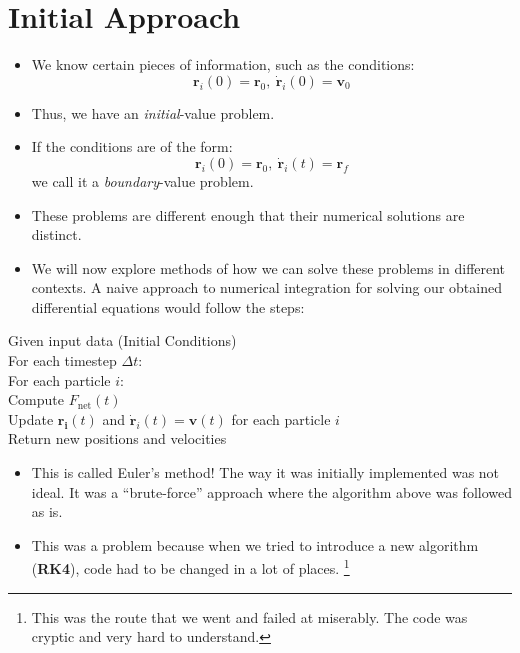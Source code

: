 \documentclass[11pt]{article}
\newcommand{\psubsection}[1]{{\section*{\LARGE #1}}}
\begin{document}
    \psubsection{Initial Approach}
    
    \begin{itemize}
        \item We know certain pieces of information, such as the conditions:
        \[ \mathbf{r}_i(0) = \mathbf{r}_0,\ \mathbf{\dot{r}}_i(0) = \mathbf{v}_0 \]
        \item Thus, we have an \emph{initial}-value problem.

        \item If the conditions are of the form:
        \[ \mathbf{r}_i(0) = \mathbf{r}_0,\ \mathbf{\dot{r}}_i(t) = \mathbf{r}_f \]
        \noindent
        we call it a \emph{boundary}-value problem.

        \item These problems are different enough that their numerical solutions are distinct.

        \item We will now explore methods of how we can solve these problems in different contexts.
        A naive approach to numerical integration for solving our obtained differential equations would follow the steps:
    \end{itemize}

    \noindent
    \indent \indent Given input data (Initial Conditions) \\
    \indent \indent \indent For each timestep $\Delta t$: \\
    \indent \indent \indent \indent For each particle $i$: \\
    \indent \indent \indent \indent \indent Compute $F_{\text{net}}(t)$ \\
    \indent \indent \indent \indent \indent Update $\mathbf{r_i}(t)$ and $\mathbf{\dot{r}}_i(t) = \mathbf{v}(t)$ for each particle $i$ \\
    \indent \indent \indent \indent \indent Return new positions and velocities

    \begin{itemize}
        \item This is called Euler's method! The way it was initially implemented was not ideal. It was a ``brute-force'' approach where the algorithm above was followed as is.
        \item This was a problem because when we tried to introduce a new algorithm (\textbf{RK4}), code had to be changed in a lot of places. \footnote{This was the route that we went and failed at miserably. The code was cryptic and very hard to understand.}
    \end{itemize}
\end{document}
